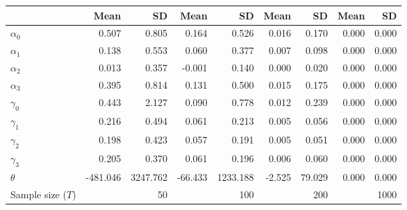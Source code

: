 
\begin{tabular}[t]{lrrrrrrrr}
\toprule
  & Mean & SD & Mean  & SD  & Mean   & SD   & Mean    & SD   \\
\midrule
$\alpha_{0}$ & 0.507 & 0.805 & 0.164 & 0.526 & 0.016 & 0.170 & 0.000 & 0.000\\
$\alpha_{1}$ & 0.138 & 0.553 & 0.060 & 0.377 & 0.007 & 0.098 & 0.000 & 0.000\\
$\alpha_{2}$ & 0.013 & 0.357 & -0.001 & 0.140 & 0.000 & 0.020 & 0.000 & 0.000\\
$\alpha_{3}$ & 0.395 & 0.814 & 0.131 & 0.500 & 0.015 & 0.175 & 0.000 & 0.000\\
$\gamma_{0}$ & 0.443 & 2.127 & 0.090 & 0.778 & 0.012 & 0.239 & 0.000 & 0.000\\
$\gamma_{1}$ & 0.216 & 0.494 & 0.061 & 0.213 & 0.005 & 0.056 & 0.000 & 0.000\\
$\gamma_{2}$ & 0.198 & 0.423 & 0.057 & 0.191 & 0.005 & 0.051 & 0.000 & 0.000\\
$\gamma_{3}$ & 0.205 & 0.370 & 0.061 & 0.196 & 0.006 & 0.060 & 0.000 & 0.000\\
$\theta$ & -481.046 & 3247.762 & -66.433 & 1233.188 & -2.525 & 79.029 & 0.000 & 0.000\\
Sample size ($T$) &  & 50 &  & 100 &  & 200 &  & 1000\\
\bottomrule
\end{tabular}
